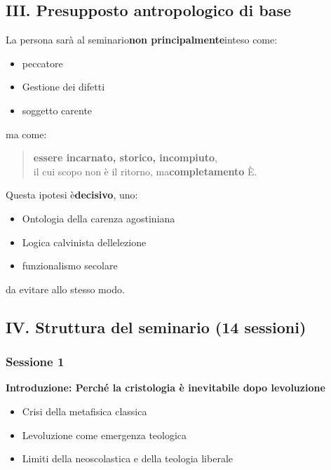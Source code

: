 \documentclass[
]{article}
\begin{document}
\subsection{\texorpdfstring{\textbf{III. Presupposto antropologico di base}}{III. Presupposto antropologico di base}}\label{iii.-presupposto-antropologico-di-base}

La persona sarà al seminario\textbf{non principalmente}inteso come:

\begin{itemize}
\item
  peccatore
\item
  Gestione dei difetti
\item
  soggetto carente
\end{itemize}

ma come:

\begin{quote}
\textbf{essere incarnato, storico, incompiuto},\\
il cui scopo non è il ritorno, ma\textbf{completamento} È.
\end{quote}

Questa ipotesi è\textbf{decisivo}, uno:

\begin{itemize}
\item
  Ontologia della carenza agostiniana
\item
  Logica calvinista dell\textquotesingle elezione
\item
  funzionalismo secolare
\end{itemize}

da evitare allo stesso modo.

\subsection{\texorpdfstring{\textbf{IV. Struttura del seminario (14 sessioni)}}{IV. Struttura del seminario (14 sessioni)}}\label{iv.-struttura-del-seminario-14-sessioni}

\subsubsection{\texorpdfstring{\textbf{Sessione 1}}{Sessione 1}}\label{sessione-1}

\textbf{Introduzione: Perché la cristologia è inevitabile dopo l\textquotesingle evoluzione}

\begin{itemize}
\item
  Crisi della metafisica classica
\item
  L\textquotesingle evoluzione come emergenza teologica
\item
  Limiti della neoscolastica e della teologia liberale
\end{itemize}
\end{document}

